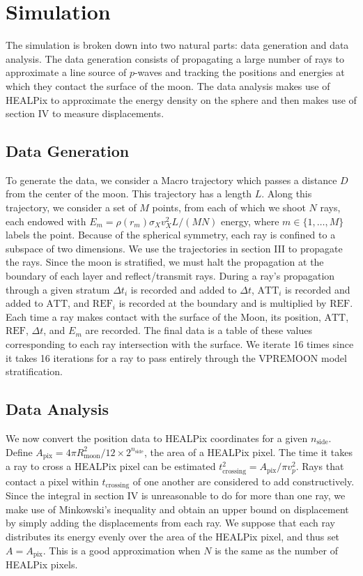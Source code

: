 \documentclass[prd,reprint,10pt,tightenlines]{revtex4-1}
\newcommand*\te[1]{\text{#1}}
\begin{document}
\section{Simulation}
The simulation is broken down into two natural parts: data generation and data analysis. The data generation consists of propagating a large number of rays to approximate a line source of $p$-waves and tracking the positions and energies at which they contact the surface of the moon. The data analysis makes use of HEALPix to approximate the energy density on the sphere and then makes use of section IV to measure displacements.
\subsection{Data Generation}
To generate the data, we consider a Macro trajectory which passes a distance $D$ from the center of the moon. This trajectory has a length $L$. Along this trajectory, we consider a set of $M$ points, from each of which we shoot $N$ rays, each endowed with $E_m = \rho(r_{m})\sigma_Xv_X^2 L/(MN)$ energy, where $m\in\{1,\dots,M\}$ labels the point. Because of the spherical symmetry, each ray is confined to a subspace of two dimensions. We use the trajectories in section III to propagate the rays. Since the moon is stratified, we must halt the propagation at the boundary of each layer and reflect/transmit rays. During a ray's propagation through a given stratum $\Delta t_i$ is recorded and added to $\Delta t$, $\te{ATT}_i$ is recorded and added to $\te{ATT}$, and $\te{REF}_i$ is recorded at the boundary and is multiplied by $\te{REF}$. Each time a ray makes contact with the surface of the Moon, its position, $\te{ATT}$, $\te{REF}$, $\Delta t$, and $E_m$ are recorded. The final data is a table of these values corresponding to each ray intersection with the surface. We iterate 16 times since it takes 16 iterations for a ray to pass entirely through the VPREMOON model stratification.
\subsection{Data Analysis}
We now convert the position data to HEALPix coordinates for a given $n_\te{side}$. Define $A_\te{pix} = 4\pi R_\te{moon}^2/12\times 2^{n_{\te{side}}}$, the area of a HEALPix pixel. The time it takes a ray to cross a HEALPix pixel can be estimated $t_\te{crossing}^2 = A_\te{pix}/\pi v_p^2$. Rays that contact a pixel within $t_\te{crossing}$ of one another are considered to add constructively. Since the integral in section IV is unreasonable to do for more than one ray, we make use of Minkowski's inequality and obtain an upper bound on displacement by simply adding the displacements from each ray. We suppose that each ray distributes its energy evenly over the area of the HEALPix pixel, and thus set $A = A_\te{pix}$. This is a good approximation when $N$ is the same as the number of HEALPix pixels. 
\end{document}
